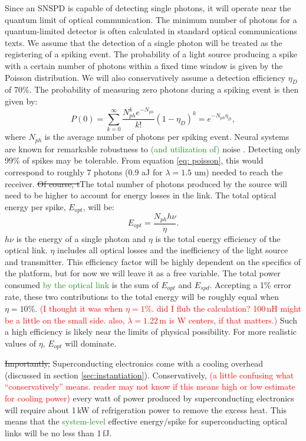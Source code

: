 \documentclass[twocolumn]{article}
\begin{document}
Since an SNSPD is capable of detecting single photons, it will operate near the quantum limit of optical communication. The minimum number of photons for a quantum-limited detector is often calculated in standard optical communications texts. We assume that the detection of a single photon will be treated as the registering of a spiking event. The probability of a light source producing a spike with a certain number of photons within a fixed time window is given by the Poisson distribution. We will also conservatively assume a detection efficiency $\eta_D$ of 70\%. The probability of measuring zero photons during a spiking event is then given by:
\begin{equation}
    P(0) = \sum_{k=0}^{\infty} \frac{N_{ph}^k e^{-N_{ph}}}{k!}(1-\eta_D)^{k} = e^{-N_{ph}\eta_D},
\label{eq: poisson}
\end{equation}
where $N_{ph}$ is the average number of photons per spiking event. Neural systems are known for remarkable robustness to \textcolor{ForestGreen}{(and utilization of)} noise \cite{}. Detecting only 99\% of spikes may be tolerable. From equation \ref{eq: poisson}, this would correspond to roughly 7 photons (0.9 aJ for $\lambda = 1.5$ um) needed to reach the receiver. \sout{Of course, t}The total number of photons produced by the source will need to be higher to account for energy losses in the link. The total optical energy per spike, $E_{opt}$, will be:
\begin{equation}
    E_{opt} = \frac{N_{ph} h \nu}{\eta}.
\end{equation}
$h\nu$ is the energy of a single photon and $\eta$ is the total energy efficiency of the optical link. $\eta$ includes all optical losses and the inefficiency of the light source and transmitter. This efficiency factor will be highly dependent on the specifics of the platform, but for now we will leave it as a free variable. The total power consumed \textcolor{ForestGreen}{by the optical link} is the sum of $E_{opt}$ and $E_{spd}$. Accepting a 1\% error rate, these two contributions to the total energy will be roughly equal when $\eta = 10\%$. \textcolor{red}{(I thought it was when $\eta = 1\%$. did I flub the calculation? 100\,nH might be a little on the small side. also, $\lambda = 1.22$\,\textmu m is W centers, if that matters.)} Such a high efficiency is likely near the limits of physical possibility. For more realistic values of $\eta$, $E_{opt}$ will dominate.

\sout{Importantly,} Superconducting electronics come with a cooling overhead (discussed in section \ref{sec:instantiation}). Conservatively, \textcolor{red}{(a little confusing what ``conservatively'' means. reader may not know if this means high or low estimate for cooling power)} every watt of power produced by superconducting electronics will require about 1\,kW of refrigeration power to remove the excess heat. This means that the \textcolor{ForestGreen}{system-level} effective energy/spike for superconducting optical links will be no less than 1\,fJ.
\end{document}
